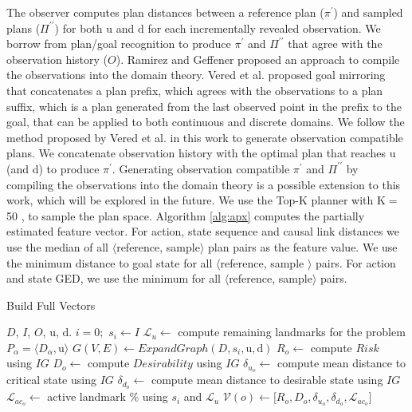 \documentclass[letterpaper]{article}
\theoremstyle{plain}
\begin{document}
The observer computes plan distances between a reference plan ($\pi^\prime$) and sampled plans ($\Pi^{\prime\prime}$) for both $\mathrm{u}$ and $\mathrm{d}$ for each incrementally revealed observation. We borrow from plan/goal recognition to produce $\pi^\prime$ and $\Pi^{\prime\prime}$ that agree with the observation history ($O$). Ramirez and Geffener  proposed an approach to compile the observations into the domain theory. Vered et al.  proposed goal mirroring that concatenates a plan prefix, which agrees with the observations to a plan suffix, which is a plan generated from the last observed point in the prefix to the goal, that can be applied to both continuous and discrete domains. We follow the method proposed by Vered et al.  in this work to generate observation compatible plans. We concatenate observation history with the optimal plan that reaches $\mathrm{u}$ (and $\mathrm{d}$) to produce $\pi^\prime$. Generating observation compatible $\pi^\prime$ and $\Pi^{\prime\prime}$ by compiling the observations into the domain theory is a possible extension to this work, which will be explored in the future. We use the Top-K planner with K$=$50 \cite{riabov2014}, to sample the plan space. Algorithm \ref{alg:apx} computes the partially estimated feature vector. For action, state sequence and causal link distances we use the median of all $\langle$reference, sample$\rangle$ plan pairs as the feature value. We use the minimum distance to goal state for all $\langle$reference, sample $\rangle$ pairs. For action and state GED, we use the minimum for all $\langle$reference, sample$\rangle$ pairs.
\vspace{-2mm}
\begin{algorithm}[tb]
        \caption{Build Full Vectors}
        \label{alg:exact}
        \begin{algorithmic}[1]
                \Require $D$, $I$, $O$, $\mathrm{u}$, $\mathrm{d}$.
                \State $i=0;$ $ s_i \gets I$
                \State $\mathcal{L}_{u} \gets$ compute remaining landmarks for the problem $P_\alpha=\langle D_\alpha, \mathrm{u}\rangle$
                        \State $G(V,E) \gets ExpandGraph(D,s_i,\mathrm{u},\mathrm{d})$
                        \State $R_o \gets$ compute $Risk$ using $IG$
                        \State $D_o \gets$ compute $Desirability$ using $IG$
                        \State $\delta_{u_o} \gets$ compute mean distance to critical state using $IG$
                        \State $\delta_{d_o} \gets$ compute mean distance to desirable state using $IG$
                        \State $\mathcal{L}_{{ac}_o} \gets$ active landmark \% using $s_i$ and  $\mathcal{L}_{u}$
                        \State $\mathcal{V}(o) \gets \lbrack R_o,D_o,\delta_{u_o}, \delta_{d_o}, \mathcal{L}_{{ac}_o}\rbrack$
                \EndFor
                \EndProcedure
        \end{algorithmic}
\end{algorithm}
\end{document}
